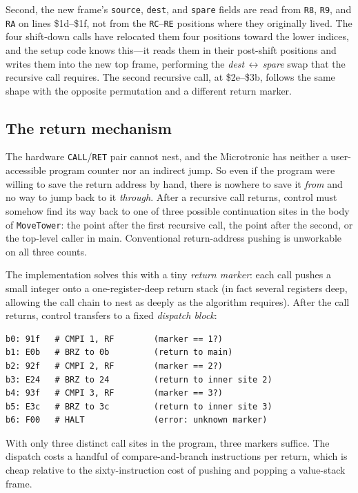\documentclass[11pt,a4paper]{article}
\begin{document}
Second, the new frame's \texttt{source}, \texttt{dest}, and
\texttt{spare} fields are read from \texttt{R8}, \texttt{R9}, and
\texttt{RA} on lines \$1d--\$1f, not from the \texttt{RC}--\texttt{RE}
positions where they originally lived. The four shift-down calls have
relocated them four positions toward the lower indices, and the
setup code knows this---it reads them in their post-shift positions
and writes them into the new top frame, performing the
\textit{dest}\,$\leftrightarrow$\,\textit{spare} swap that the
recursive call requires. The second recursive call, at \$2e--\$3b,
follows the same shape with the opposite permutation and a different
return marker.

\subsection{The return mechanism}

The hardware \texttt{CALL}/\texttt{RET} pair cannot nest, and the
Microtronic has neither a user-accessible program counter nor an
indirect jump. So even if the program were willing to save the return
address by hand, there is nowhere to save it \emph{from} and no way
to jump back to it \emph{through}. After a recursive call returns,
control must somehow find its way back to one of three possible
continuation sites in the body of \texttt{MoveTower}: the point after
the first recursive call, the point after the second, or the
top-level caller in main. Conventional return-address pushing is
unworkable on all three counts.

The implementation solves this with a tiny \emph{return marker}: each
call pushes a small integer onto a one-register-deep return stack (in
fact several registers deep, allowing the call chain to nest as
deeply as the algorithm requires). After the call returns, control
transfers to a fixed \emph{dispatch block}:

\begin{lstlisting}
b0: 91f   # CMPI 1, RF        (marker == 1?)
b1: E0b   # BRZ to 0b         (return to main)
b2: 92f   # CMPI 2, RF        (marker == 2?)
b3: E24   # BRZ to 24         (return to inner site 2)
b4: 93f   # CMPI 3, RF        (marker == 3?)
b5: E3c   # BRZ to 3c         (return to inner site 3)
b6: F00   # HALT              (error: unknown marker)
\end{lstlisting}

\noindent
With only three distinct call sites in the program, three markers
suffice. The dispatch costs a handful of compare-and-branch
instructions per return, which is cheap relative to the
sixty-instruction cost of pushing and popping a value-stack frame.
\end{document}
